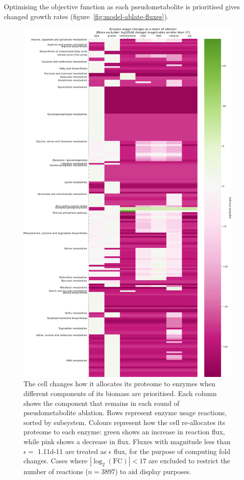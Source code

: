 Optimising the objective function as each pseudometabolite is prioritised gives changed growth rates (figure~\ref{fig:model-ablate-fluxes}).

\begin{figure}
  \centering
  \includegraphics[width=.8\linewidth]{allocation_fc}
  \caption{
    The cell changes how it allocates its proteome to enzymes when different components of its biomass are prioritised.
    Each column shows the component that remains in each round of pseudometabolite ablation.
    Rows represent enzyme usage reactions, sorted by subsystem.
    Colours represent how the cell re-allocates its proteome to each enzyme: green shows an increase in reaction flux, while pink shows a decrease in flux.
    Fluxes with magnitude less than $\epsilon = $ \SI{1.11d-11}{\mmolgdw} are treated as $\epsilon$ flux, for the purpose of computing fold changes.
    Cases where $|\log_{2}(\mathrm{FC})| < 17$ are excluded to restrict the number of reactions ($n = 3897$) to aid display purposes.
  }
  \label{fig:model-ablate-enz-use}
\end{figure}

